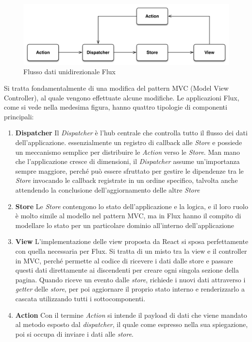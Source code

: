 \begin{figure}[ht]
	\centering
	\includegraphics[width=\textwidth]{6-implementazione-app/immagini/flux.png}
	\caption{Flusso dati unidirezionale Flux}\label{fig:flux}
\end{figure}
Si tratta fondamentalmente di una modifica del pattern MVC (Model View Controller), al quale vengono effettuate alcune modifiche.
Le applicazioni Flux, come si vede nella medesima figura, hanno quattro tipologie di componenti principali: 
\begin{enumerate}
	\item \textbf{Dispatcher}
	Il \emph{Dispatcher} è l'hub centrale che controlla tutto il flusso dei dati dell'applicazione. \upe essenzialmente un registro di callback alle \emph{Store} e possiede un meccanismo semplice per distribuire le \emph{Action} verso le \emph{Store}. Man mano che l'applicazione cresce di dimensioni, il \emph{Dispatcher} assume un'importanza sempre maggiore, perché può essere sfruttato per gestire le dipendenze tra le \emph{Store} invocando le callback registrate in un ordine specifico, talvolta anche attendendo la conclusione dell'aggiornamento delle altre \emph{Store} 
	\item \textbf{Store}
	Le \emph{Store} contengono lo stato dell'applicazione e la logica, e il loro ruolo è molto simile al modello nel pattern MVC, ma in Flux hanno il compito di modellare lo stato per un particolare dominio all'interno dell'applicazione
	\item \textbf{View}
	L'implementazione delle view proposta da React si sposa perfettamente con quella necessaria per Flux. Si tratta di un misto tra la view e il controller in MVC, perché permette al codice di ricevere i dati dalle store e passare questi dati direttamente ai discendenti per creare ogni singola sezione della pagina. Quando riceve un evento dalle \emph{store}, richiede i nuovi dati attraverso i \emph{getter} delle \emph{store}, per poi aggiornare il proprio stato interno e renderizzarlo a cascata utilizzando tutti i sottocomponenti.
	\item \textbf{Action} Con il termine \emph{Action} si intende il payload di dati che viene mandato al metodo esposto dal \emph{dispatcher}, il quale come espresso nella sua spiegazione, poi si occupa di inviare i dati alle \emph{store}.
\end{enumerate} 

